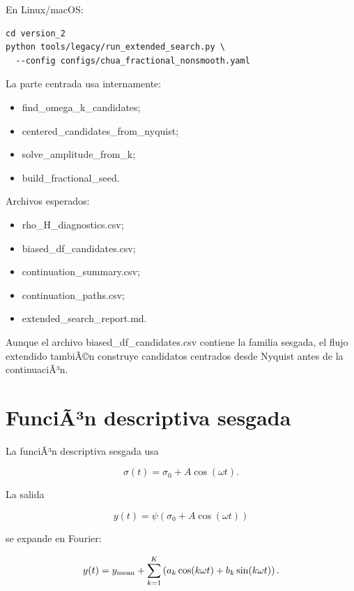 \documentclass[11pt]{article}
\DeclareRobustCommand{\codepath}[1]{\begingroup\Urlmuskip=0mu plus 2mu\path{#1}\endgroup}
\def\codepath#1{#1}%
\begin{document}
En Linux/macOS:

\begin{lstlisting}
cd version_2
python tools/legacy/run_extended_search.py \
  --config configs/chua_fractional_nonsmooth.yaml
\end{lstlisting}

La parte centrada usa internamente:

\begin{itemize}
\item \codepath{find_omega_k_candidates};
\item \codepath{centered_candidates_from_nyquist};
\item \codepath{solve_amplitude_from_k};
\item \codepath{build_fractional_seed}.
\end{itemize}

Archivos esperados:

\begin{itemize}
\item \codepath{rho_H_diagnostics.csv};
\item \codepath{biased_df_candidates.csv};
\item \codepath{continuation_summary.csv};
\item \codepath{continuation_paths.csv};
\item \codepath{extended_search_report.md}.
\end{itemize}

Aunque el archivo \codepath{biased_df_candidates.csv} contiene la familia sesgada, el flujo extendido tambiÃ©n construye candidatos centrados desde Nyquist antes de la continuaciÃ³n.

\section{FunciÃ³n descriptiva sesgada}

La funciÃ³n descriptiva sesgada usa

\begin{equation}
\sigma(t)=\sigma_0+A\cos(\omega t).
\end{equation}

La salida

\begin{equation}
y(t)=\psi(\sigma_0+A\cos(\omega t))
\end{equation}

se expande en Fourier:

\begin{equation}
y(t)=y_{\rm mean}+\sum_{k=1}^{K}
\left(a_k\cos(k\omega t)+b_k\sin(k\omega t)\right).
\end{equation}
\end{document}
